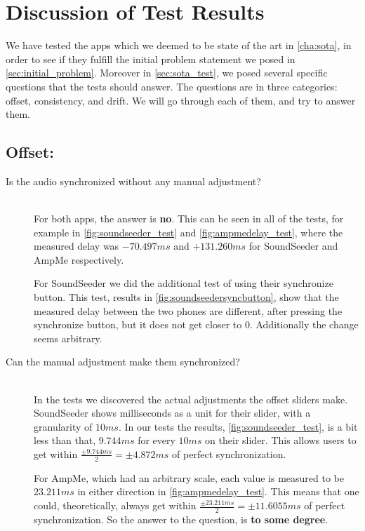 \section{Discussion of Test Results}

We have tested the apps which we deemed to be state of the art in \cref{cha:sota}, in order to see if they fulfill the initial problem statement we posed in \vref{sec:initial_problem}.
Moreover in \vref{sec:sota_test}, we posed several specific questions that the tests should answer.
The questions are in three categories: offset, consistency, and drift.
We will go through each of them, and try to answer them.

\subsection*{Offset:}
\begin{description}
    \item[Is the audio synchronized without any manual adjustment?] \hfill \\
    For both apps, the answer is \textbf{no}.
    This can be seen in all of the tests, for example in \vref{fig:soundseeder_test} and \vref{fig:ampmedelay_test}, where the measured delay was $-70.497 ms$ and $+131.260 ms$ for SoundSeeder and AmpMe respectively.

    For SoundSeeder we did the additional test of using their synchronize button.
    This test, results in \vref{fig:soundseedersyncbutton}, show that the measured delay between the two phones are different, after pressing the synchronize button, but it does not get closer to $0$.
    Additionally the change seems arbitrary.
    \item[Can the manual adjustment make them synchronized?] \hfill \\
    In the tests we discovered the actual adjustments the offset sliders make.
    SoundSeeder shows milliseconds as a unit for their slider, with a granularity of $10 ms$.
    In our tests the results, \vref{fig:soundseeder_test}, is a bit less than that, $9.744 ms$ for every $10 ms$ on their slider.
    This allows users to get within $\frac{\pm9.744 ms}{2}=\pm 4.872 ms$ of perfect synchronization.

    For AmpMe, which had an arbitrary scale, each value is measured to be $23.211 ms$ in either direction in \vref{fig:ampmedelay_test}.
    This means that one could, theoretically, always get within $\frac{\pm23.211 ms}{2}=\pm 11.6055 ms$ of perfect synchronization.
    So the answer to the question, is \textbf{to some degree}.
\end{description}

